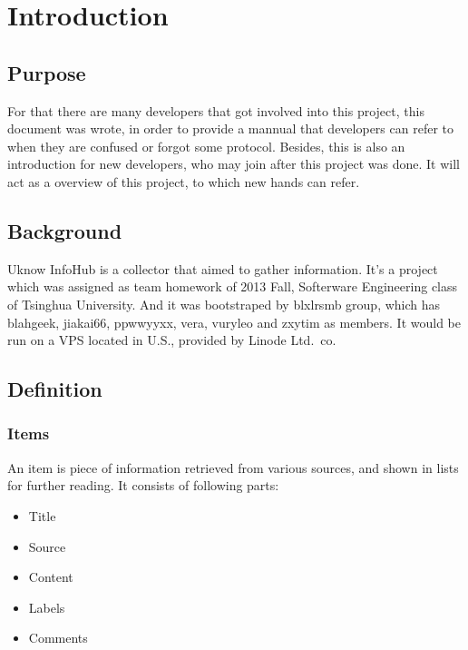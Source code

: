 
\section{Introduction}
  \subsection{Purpose}
    For that there are many developers that got involved into this project,
    this document was wrote, in order to provide a mannual that developers can refer to
    when they are confused or forgot some protocol.
    Besides, this is also an introduction for new developers, who may join after this project was done.
    It will act as a overview of this project, to which new hands can refer.

  \subsection{Background}

    Uknow InfoHub is a collector that aimed to gather information.
    It's a project which was assigned as team homework of 2013 Fall, Softerware Engineering class of Tsinghua University.
    And it was bootstraped by blxlrsmb group, which has blahgeek, jiakai66, ppwwyyxx, vera, vuryleo and zxytim as members.
    It would be run on a VPS located in U.S., provided by Linode Ltd.\ co.

  \subsection{Definition}
    \subsubsection{Items}

      An item is piece of information retrieved from various sources, and
      shown in lists for further reading. It consists of following parts:

      \begin{itemize}
      \itemsep1pt\parskip0pt
      \item
        Title
      \item
        Source
      \item
        Content
      \item
        Labels
      \item
        Comments
      \end{itemize}

